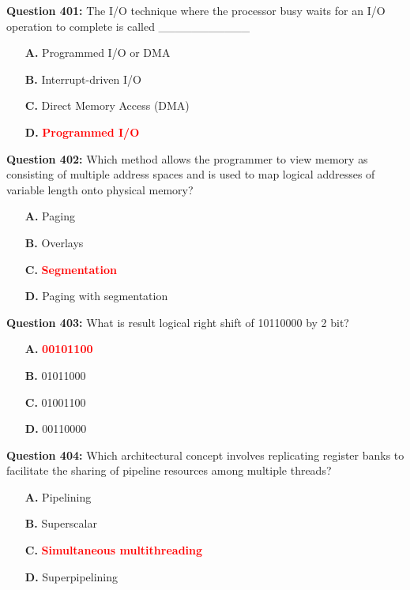\documentclass[12pt,a4paper]{article}
\begin{document}
\textbf{Question 401:} The I/O technique where the processor busy waits for an I/O operation to complete is called ___________

\begin{itemize}
    \item[\textbf{A.}] Programmed I/O or DMA
    \item[\textbf{B.}] Interrupt-driven I/O
    \item[\textbf{C.}] Direct Memory Access (DMA)
    \item[\textbf{D.}] \textcolor{red}{\textbf{Programmed I/O}}
\end{itemize}

\vspace{0.5cm}

\textbf{Question 402:} Which method allows the programmer to view memory as consisting of multiple address spaces and is used to map logical addresses of variable length onto physical memory?

\begin{itemize}
    \item[\textbf{A.}] Paging
    \item[\textbf{B.}] Overlays
    \item[\textbf{C.}] \textcolor{red}{\textbf{Segmentation}}
    \item[\textbf{D.}] Paging with segmentation
\end{itemize}

\vspace{0.5cm}

\textbf{Question 403:} What is result logical right shift of 10110000 by 2 bit?

\begin{itemize}
    \item[\textbf{A.}] \textcolor{red}{\textbf{00101100}}
    \item[\textbf{B.}] 01011000
    \item[\textbf{C.}] 01001100
    \item[\textbf{D.}] 00110000
\end{itemize}

\vspace{0.5cm}

\textbf{Question 404:} Which architectural concept involves replicating register banks to facilitate the sharing of pipeline resources among multiple threads?

\begin{itemize}
    \item[\textbf{A.}] Pipelining
    \item[\textbf{B.}] Superscalar
    \item[\textbf{C.}] \textcolor{red}{\textbf{Simultaneous multithreading}}
    \item[\textbf{D.}] Superpipelining
\end{itemize}
\end{document}
